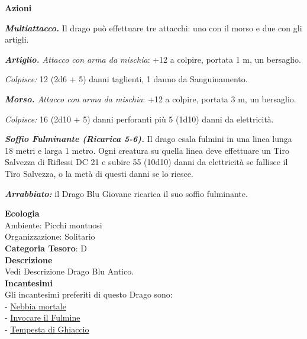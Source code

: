 \begin{multicols}{2}
{\textbf{Azioni}

\emph{\textbf{Multiattacco.}} Il drago può effettuare tre attacchi: uno con il morso e due con gli artigli.

\emph{\textbf{Artiglio.} Attacco con arma da mischia}: +12 a colpire, portata 1 m, un bersaglio.

\emph{Colpisce:} 12 (2d6 + 5) danni taglienti, 1 danno da Sanguinamento.

\emph{\textbf{Morso.} Attacco con arma da mischia}: +12 a colpire, portata 3 m, un bersaglio.

\emph{Colpisce:} 16 (2d10 + 5) danni perforanti più 5 (1d10) danni da elettricità.

\emph{\textbf{Soffio Fulminante (Ricarica 5-6).}} Il drago esala fulmini in una linea lunga 18 metri e larga 1 metro. Ogni creatura su quella linea deve effettuare un Tiro Salvezza di Riflessi DC 21 e subire 55 (10d10) danni da elettricità se fallisce il Tiro Salvezza, o la metà di questi danni se lo riesce.

\emph{\textbf{Arrabbiato:}} il Drago Blu Giovane ricarica il suo soffio fulminante.

\textbf{Ecologia}\\
Ambiente: Picchi montuosi\\
Organizzazione: Solitario\\
\textbf{Categoria Tesoro}: D\\
\textbf{Descrizione}\\
Vedi Descrizione Drago Blu Antico.\\
\textbf{Incantesimi}\\
Gli incantesimi preferiti di questo Drago sono:\\
- \hyperlink{Nebbia mortale}{Nebbia mortale}\\
- \hyperlink{Invocare il Fulmine}{Invocare il Fulmine}\\
- \hyperlink{Tempesta di Ghiaccio}{Tempesta di Ghiaccio}

}
\end{multicols}
